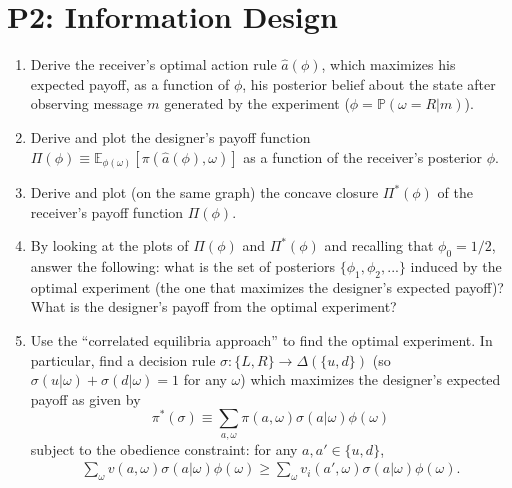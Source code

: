 \documentclass{article}
\newcommand{\enterProblemHeader}[1]{
\nobreak\extramarks{#1}{#1 continued on next page\ldots}\nobreak
\nobreak\extramarks{#1 (continued)}{#1 continued on next page\ldots}\nobreak
}
\newcommand{\exitProblemHeader}[1]{
\nobreak\extramarks{#1 (continued)}{#1 continued on next page\ldots}\nobreak
\nobreak\extramarks{#1}{}\nobreak
}
\newcounter{homeworkProblemCounter} %
\newcommand{\homeworkProblemName}{}
\newenvironment{ex}[1][Problem \arabic{homeworkProblemCounter}]{ %
\stepcounter{homeworkProblemCounter} %
\renewcommand{\homeworkProblemName}{#1} %
\section{\homeworkProblemName} %
}{
}
\newif\ifsolutions
\begin{document}
\begin{ex}[P2: Information Design]
	\begin{enumerate}
		\item Derive the receiver's optimal action rule $\hat{a}(\phi)$, which maximizes his expected payoff, as a function of $\phi$, his posterior belief about the state after observing message $m$ generated by the experiment ($\phi = \mathbb{P} (\omega=R | m)$).
		\item Derive and plot the designer's payoff function $\Pi(\phi) \equiv \mathbb{E}_{\phi(\omega)} \left[\pi (\hat{a}(\phi), \omega)\right]$ as a function of the receiver's posterior $\phi$.
		\item Derive and plot (on the same graph) the concave closure $\Pi^* (\phi)$ of the receiver's payoff function $\Pi(\phi)$.
		\item By looking at the plots of $\Pi(\phi)$ and $\Pi^* (\phi)$ and recalling that $\phi_0 = 1/2$, answer the following: what is the set of posteriors $\{\phi_1, \phi_2, ...\}$ induced by the optimal experiment (the one that maximizes the designer's expected payoff)? What is the designer's payoff from the optimal experiment?
		\item Use the ``correlated equilibria approach'' to find the optimal experiment. In particular, find a decision rule $\sigma: \{L,R\} \to \varDelta(\{u,d\})$ (so $\sigma(u|\omega)+\sigma(d|\omega)=1$ for any $\omega$) which maximizes the designer's expected payoff as given by
		\begin{equation*}
			\pi^* (\sigma) \equiv  \sum_{a,\omega} \pi(a,\omega) \sigma (a | \omega) \phi(\omega)
		\end{equation*}
		subject to the obedience constraint: for any $a,a' \in \{u,d\}$,
		\begin{align*}
		\sum_{\omega} v (a, \omega) \sigma (a | \omega) \phi(\omega) 
		\geq \sum_{\omega} v_i (a', \omega) \sigma (a | \omega) \phi(\omega) .
		\end{align*} 
	\end{enumerate}
	

	\ifsolutions
	\subsection*{Solution}
	
	\fi
\end{ex}



\end{document}
